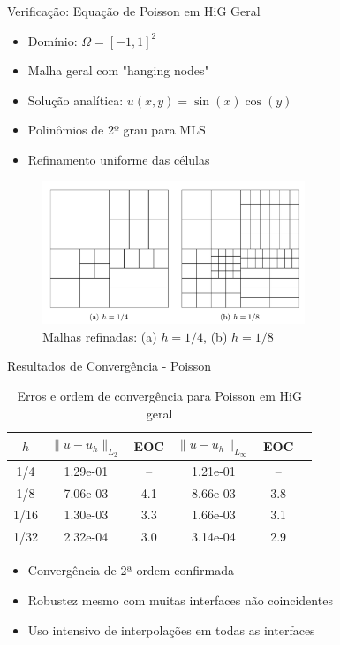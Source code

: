 \documentclass[../main/main.tex]{subfiles}
\begin{document}
\begin{frame}{Verificação: Equação de Poisson em HiG Geral}
\begin{itemize}
\item Domínio: $\Omega = [-1, 1]^2$
\item Malha geral com "hanging nodes"
\item Solução analítica: $u(x, y) = \sin(x)\cos(y)$
\item Polinômios de 2º grau para MLS
\item Refinamento uniforme das células
\end{itemize}

\begin{figure}
\centering
\includegraphics[width=0.7\textwidth]{imgs/figura4.png}
\caption{Malhas refinadas: (a) $h=1/4$, (b) $h=1/8$}
\end{figure}
\end{frame}

\begin{frame}{Resultados de Convergência - Poisson}
\begin{table}
\centering
\caption{Erros e ordem de convergência para Poisson em HiG geral}
\begin{tabular}{cccccc}
\toprule
$h$ & $\|u-u_h\|_{L_2}$ & EOC & $\|u-u_h\|_{L_\infty}$ & EOC \\
\midrule
1/4 & 1.29e-01 & -- & 1.21e-01 & -- \\
1/8 & 7.06e-03 & 4.1 & 8.66e-03 & 3.8 \\
1/16 & 1.30e-03 & 3.3 & 1.66e-03 & 3.1 \\
1/32 & 2.32e-04 & 3.0 & 3.14e-04 & 2.9 \\
\bottomrule
\end{tabular}
\end{table}

\begin{itemize}
\item Convergência de 2ª ordem confirmada
\item Robustez mesmo com muitas interfaces não coincidentes
\item Uso intensivo de interpolações em todas as interfaces
\end{itemize}
\end{frame}
\end{document}
